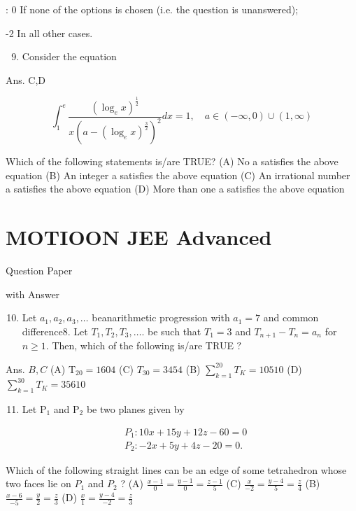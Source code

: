 \documentclass[10pt]{article}
\begin{document}
: 0 If none of the options is chosen (i.e. the question is unanswered);

-2 In all other cases.

\begin{enumerate}
  \setcounter{enumi}{8}
  \item Consider the equation
\end{enumerate}

Ans. C,D

$$
\int_{1}^{e} \frac{\left(\log _{e} x\right)^{\frac{1}{2}}}{x\left(a-\left(\log _{e} x\right)^{\frac{3}{2}}\right)^{2}} d x=1, \quad a \in(-\infty, 0) \cup(1, \infty)
$$

Which of the following statements is/are TRUE?
(A) No a satisfies the above equation
(B) An integer a satisfies the above equation
(C) An irrational number a satisfies the above equation
(D) More than one a satisfies the above equation

\section{MOTIOON JEE Advanced}
Question Paper

with Answer

\begin{enumerate}
  \setcounter{enumi}{9}
  \item Let $a_{1}, a_{2}, a_{3}, \ldots$ beanarithmetic progression with $a_{1}=7$ and common difference8. Let $T_{1}, T_{2}, T_{3}, \ldots$. be such that $T_{1}=3$ and $T_{n+1}-T_{n}=a_{n}$ for $n \geq 1$. Then, which of the following is/are TRUE $?$
\end{enumerate}

Ans. $B, C$
(A) $\mathrm{T}_{20}=1604$
(C) $T_{30}=3454$
(B) $\sum_{k=1}^{20} T_{K}=10510$
(D) $\sum_{k=1}^{30} T_{K}=35610$

\begin{enumerate}
  \setcounter{enumi}{10}
  \item Let $\mathrm{P}_{1}$ and $\mathrm{P}_{2}$ be two planes given by
\end{enumerate}

$$
\begin{aligned}
& P_{1}: 10 x+15 y+12 z-60=0 \\
& P_{2}:-2 x+5 y+4 z-20=0 .
\end{aligned}
$$

Which of the following straight lines can be an edge of some tetrahedron whose two faces lie on $P_{1}$ and $P_{2}$ ?
(A) $\frac{x-1}{0}=\frac{y-1}{0}=\frac{z-1}{5}$
(C) $\frac{x}{-2}=\frac{y-4}{5}=\frac{z}{4}$
(B) $\frac{x-6}{-5}=\frac{y}{2}=\frac{z}{3}$
(D) $\frac{x}{1}=\frac{y-4}{-2}=\frac{z}{3}$
\end{document}
